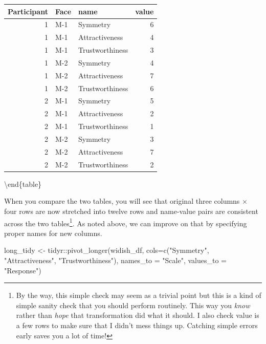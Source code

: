 \documentclass[
]{book}
\newenvironment{Shaded}{\begin{snugshade}}{\end{snugshade}}
\newcommand{\AttributeTok}[1]{\textcolor[rgb]{0.77,0.63,0.00}{#1}}
\newcommand{\FunctionTok}[1]{\textcolor[rgb]{0.00,0.00,0.00}{#1}}
\newcommand{\NormalTok}[1]{#1}
\newcommand{\OtherTok}[1]{\textcolor[rgb]{0.56,0.35,0.01}{#1}}
\newcommand{\SpecialCharTok}[1]{\textcolor[rgb]{0.00,0.00,0.00}{#1}}
\newcommand{\StringTok}[1]{\textcolor[rgb]{0.31,0.60,0.02}{#1}}
\begin{document}
\begin{tabular}[t]{r|l|l|r}
\hline
Participant & Face & name & value\\
\hline
1 & M-1 & Symmetry & 6\\
\hline
1 & M-1 & Attractiveness & 4\\
\hline
1 & M-1 & Trustworthiness & 3\\
\hline
1 & M-2 & Symmetry & 4\\
\hline
1 & M-2 & Attractiveness & 7\\
\hline
1 & M-2 & Trustworthiness & 6\\
\hline
2 & M-1 & Symmetry & 5\\
\hline
2 & M-1 & Attractiveness & 2\\
\hline
2 & M-1 & Trustworthiness & 1\\
\hline
2 & M-2 & Symmetry & 3\\
\hline
2 & M-2 & Attractiveness & 7\\
\hline
2 & M-2 & Trustworthiness & 2\\
\hline
\end{tabular}

\textbackslash end\{table\}

When you compare the two tables, you will see that original three columns × four rows are now stretched into twelve rows and name-value pairs are consistent across the two tables\footnote{By the way, this simple check may seem as a trivial point but this is a kind of simple sanity check that you should perform routinely. This way you \emph{know} rather than \emph{hope} that transformation did what it should. I also check value is a few rows to make sure that I didn't mess things up. Catching simple errors early saves you a lot of time!}. As noted above, we can improve on that by specifying proper names for new columns.

\begin{Shaded}
\begin{Highlighting}[]
\NormalTok{long\_tidy }\OtherTok{\textless{}{-}}\NormalTok{ tidyr}\SpecialCharTok{::}\FunctionTok{pivot\_longer}\NormalTok{(widish\_df, }
                               \AttributeTok{cols=}\FunctionTok{c}\NormalTok{(}\StringTok{"Symmetry"}\NormalTok{, }\StringTok{"Attractiveness"}\NormalTok{, }\StringTok{"Trustworthiness"}\NormalTok{),}
                               \AttributeTok{names\_to =} \StringTok{"Scale"}\NormalTok{,}
                               \AttributeTok{values\_to =} \StringTok{"Response"}\NormalTok{)}
\end{Highlighting}
\end{Shaded}
\end{document}
